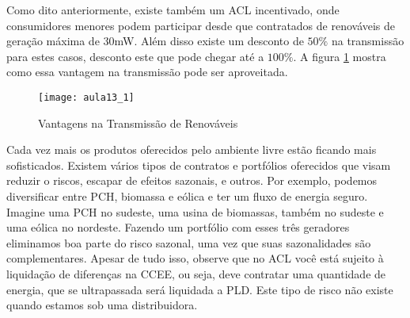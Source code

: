 Como dito anteriormente, existe também um ACL incentivado, onde consumidores menores podem participar desde que contratados de renováveis de geração máxima de 30mW. Além disso existe um desconto de $50\%$ na transmissão para estes casos, desconto este que pode chegar até a $100\%$. A figura \ref{fig:aula13_1} mostra como essa vantagem na transmissão pode ser aproveitada. 


\begin{figure}[H]
\begin{centering}
\texttt{[image: aula13\_1]}\protect\caption{\label{fig:aula13_1} Vantagens na Transmissão de Renováveis}
\end{centering}
\end{figure}

Cada vez mais os produtos oferecidos pelo ambiente livre estão ficando mais sofisticados. Existem vários tipos de contratos e portfólios oferecidos que visam reduzir o riscos, escapar de efeitos sazonais, e outros. Por exemplo, podemos diversificar entre PCH, biomassa e eólica e ter um fluxo de energia seguro. Imagine uma PCH no sudeste, uma usina de biomassas, também no sudeste e uma eólica no nordeste. Fazendo um portfólio com esses três geradores eliminamos boa parte do risco sazonal, uma vez que suas sazonalidades são complementares. Apesar de tudo isso, observe que no ACL você está sujeito à liquidação de diferenças na CCEE, ou seja, deve contratar uma quantidade de energia, que se ultrapassada será liquidada a PLD. Este tipo de risco não existe quando estamos sob uma distribuidora.  




